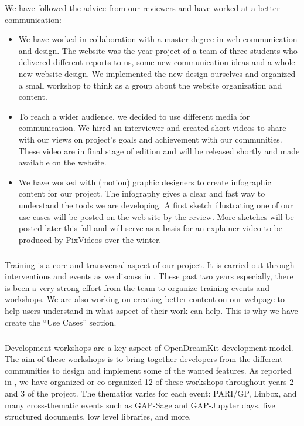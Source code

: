 We have followed the advice from our reviewers and have worked at a better communication:
\begin{itemize}
\item We have worked in collaboration with a master degree in web communication and design. The 
\ODK website was the year project of a team of three students who delivered different reports to us, some
new communication ideas and a whole new website design. We implemented the new design ourselves and 
organized a small workshop to think as a group about the website organization and content. 
\item To reach a wider audience, we decided to use different media for communication. We hired an interviewer
and created short videos to share with our views on project's goals and achievement with our communities. These
video are in final stage of edition and will be released shortly and made available on the website.

\item We have worked with (motion) graphic designers to create
  infographic content for our project. The infography gives a clear
  and fast way to understand the tools we are developing. A first
  sketch illustrating one of our use cases will be posted on the web
  site by the review. More sketches will be posted later this fall and
  will serve as a basis for an explainer video to be produced by
  PixVideos over the winter.
\end{itemize}

\subparagraph{}

Training is a core and transversal aspect of our project. It is carried out
through interventions and events as we discuss in . These 
past two years especially, there is been a very strong effort from the \ODK team to organize 
training events and workshops. We are also working on creating better content on our webpage
to help users understand in what aspect of their work can \ODK help. This is why we have create the 
``Use Cases'' section.

\subparagraph{}
\label{dissem@devel-workshops}

Development workshops are a key aspect of OpenDreamKit development model. The aim of these workshops is to bring together developers from the different communities to design and implement some
of the wanted features. As reported in , we have organized
or co-organized 12 of these workshops throughout years 2 and 3 of the project. The thematics varies
for each event: PARI/GP, Linbox, and many cross-thematic events such as GAP-Sage and GAP-Jupyter days, 
live structured documents, low level libraries, and more.

